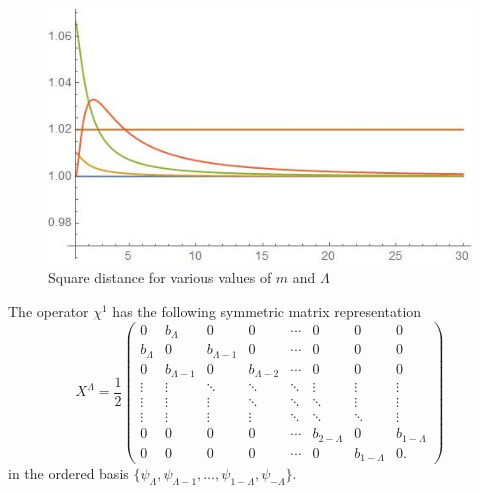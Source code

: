 \begin{figure}
    \centering
    \includegraphics{images/R^2.jpg}
    \caption{Square distance for various values of $m$ and $\Lambda$}
    \label{fig:R2Chi}
\end{figure}

The operator $\chi^1$ has the following symmetric matrix representation
\begin{equation}
    X^\Lambda = \frac{1}{2} 
    \begin{pmatrix} 
    0 & b_\Lambda & 0 & 0& \cdots & 0& 0 & 0 \\
    b_\Lambda & 0 & b_{\Lambda - 1} & 0 & \cdots & 0 & 0 & 0\\
    0 & b_{\Lambda-1} & 0 & b_{\Lambda - 2} & \cdots & 0 & 0 &0\\
    \vdots & \vdots & \ddots & \ddots & \ddots & \vdots & \vdots & \vdots\\
    \vdots & \vdots & \vdots & \ddots & \ddots & \ddots & \vdots & \vdots\\
    \vdots & \vdots & \vdots & \vdots & \ddots & \ddots & \ddots & \vdots\\
    0 & 0 & 0 & 0 & \cdots & b_{2-\Lambda} & 0 & b_{1-\Lambda}\\
    0 & 0 & 0 &0 & \cdots & 0 & b_{1-\Lambda} & 0.
    \end{pmatrix}                                                                                                                           
\end{equation}
in the ordered basis $\{\psi_\Lambda, \psi_{\Lambda - 1}, \dots, \psi_{1-\Lambda}, \psi_{-\Lambda}\}$.

